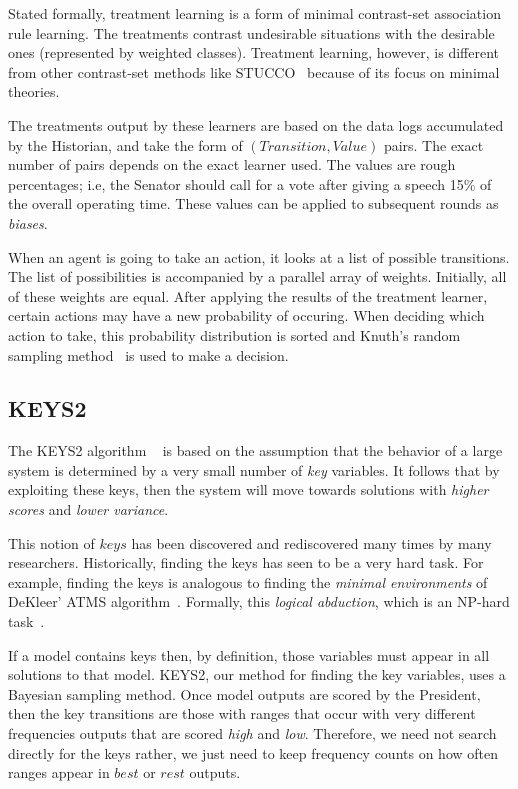 \documentclass{sig-alternate}
\newcounter{over}
\begin{document}
Stated formally, treatment learning is a form of minimal
contrast-set association rule learning. 
The treatments contrast undesirable situations with the 
desirable ones (represented by weighted classes).
Treatment learning, however, is different from other contrast-set methods
like STUCCO~\cite{bay99} because of its focus on minimal theories. 

The treatments output by these learners are based on the data logs 
accumulated by the Historian, and take the form of $(Transition, Value)$
pairs. The exact number of pairs depends on the exact learner used.
The values are rough percentages; i.e, the Senator should call for a 
vote after giving a speech 15\% of the overall operating time. These 
values can be applied to subsequent rounds as {\em biases}. 

When an agent is going to take an action, it looks at a list of possible
transitions. The list of possibilities is accompanied by a parallel array of weights.
Initially, all of these weights are equal. After applying the results
of the treatment learner, certain actions may have a new probability of
occuring. When deciding which action to take, this probability
distribution is sorted and Knuth's random sampling method~\cite{knuthArt} is used to make a decision. 

\subsection{KEYS2}

The KEYS2 algorithm ~\cite{gay09keys,jalali08} is based on the
assumption that the behavior of a large system is
determined by a very small number of {\em key} variables. 
It follows that by exploiting these keys, then the system will
move towards solutions with {\em higher scores} and {\em lower variance}.

This notion of $keys$ has been
discovered and rediscovered
many times by many researchers.
Historically, finding the keys has seen to be a very  hard task. For example, finding the keys is analogous to finding the {\em minimal environments}
of DeKleer' ATMS algorithm~\cite{deKleer86}. Formally, this {\em logical abduction}, which is an NP-hard task~\cite{by91}.

If a model contains keys then, by definition, those variables 
must appear in all solutions
to that model. KEYS2, our method for finding the key variables, uses a Bayesian 
sampling method. Once model outputs are scored by the President, 
then the key transitions are those with ranges that occur with very different frequencies outputs that are scored {\em high} and {\em low}.
Therefore, we need not search directly for the keys rather, we just need to keep frequency counts on how often ranges appear in $best$ or $rest$ outputs.
\end{document}
